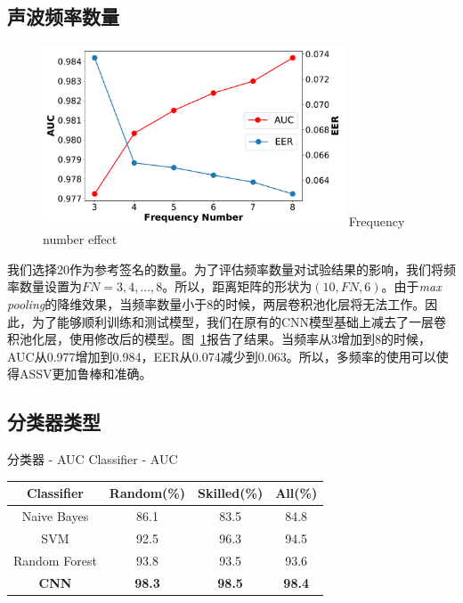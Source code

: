 \subsection{声波频率数量}
\begin{figure}
  \centering
  \includegraphics[width=0.8\textwidth]{figure/multi_frequency_auc_eer.pdf}
      {Frequency number effect}
  \label{fig:frequency-number}
\end{figure}
我们选择20作为参考签名的数量。为了评估频率数量对试验结果的影响，我们将频率数量设置为$FN=3, 4,..., 8$。所以，距离矩阵的形状为$(10, FN, 6)$。由于\textit{max pooling}的降维效果，当频率数量小于8的时候，两层卷积池化层将无法工作。因此，为了能够顺利训练和测试模型，我们在原有的CNN模型基础上减去了一层卷积池化层，使用修改后的模型。图~\ref{fig:frequency-number}报告了结果。当频率从3增加到8的时候，AUC从0.977增加到0.984，EER从0.074减少到0.063。所以，多频率的使用可以使得ASSV更加鲁棒和准确。

\subsection{分类器类型}
\begin{table}[ht]
  \centering
  \bicaption
  {分类器 - AUC}
  {Classifier - AUC} 
  \label{table:classifier-auc} 
  \begin{tabular}{c c c c} 
      \hline\hline 
      Classifier & Random(\%) & Skilled(\%) & All(\%) \\ 
      \hline 
      Naive Bayes & 86.1 & 83.5 & 84.8 \\
      SVM & 92.5 & 96.3 & 94.5 \\
      Random Forest & 93.8 & 93.5 & 93.6 \\
       \textbf{CNN} &  \textbf{98.3} &  \textbf{98.5} &  \textbf{98.4} \\
      \hline 
  \end{tabular}
\end{table}


